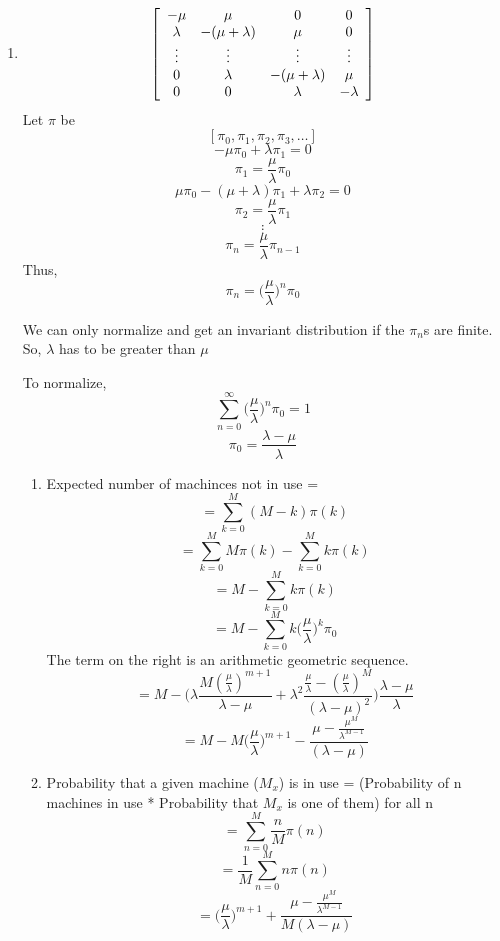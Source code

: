 \documentclass[a4paper,11pt]{article}
\newenvironment{mat}{\left[ \begin{array}{ccccccccccccc}}{\end{array}\right]}
\newcommand\bcm{\begin{mat}}
\newcommand\ecm{\end{mat}}
\begin{document}
\begin{enumerate}
\item
\[\bcm -\mu &\mu &0 &0  \\ \lambda &-(\mu+\lambda) &\mu  &0 \\ \vdots &\vdots   &\vdots &\vdots \\0 &\lambda &-(\mu+\lambda) &\mu    \\ 0 &0   &\lambda &-\lambda \ecm\]
Let $\pi$ be
\[ [\pi_0, \pi_1, \pi_2,\pi_3 ,\ldots]\]
\[-\mu \pi_0 + \lambda \pi_1 =0\]
\[\pi_1 = \frac{\mu}{\lambda}\pi_0\]
\[\mu \pi_{0} -(\mu +\lambda)\pi_1 + \lambda \pi_{2} =0\]
\[\pi_2 = \frac{\mu}{\lambda} \pi_1\]
\[\vdots\]
\[\pi_n = \frac{\mu}{\lambda} \pi_{n-1}\]
Thus, \[\pi_n =\bigg(\frac{\mu}{\lambda}\bigg)^n \pi_0 \]


We can only normalize and get an invariant distribution if the $\pi_n$s are finite. So, $\lambda$ has to be greater than $\mu$

To normalize,
\[\sum_{n=0}^{\infty} \bigg(\frac{\mu}{\lambda}\bigg)^n \pi_0= 1 \]
\[ \pi_0= \frac{\lambda-\mu}{\lambda}\]
\begin{enumerate}
\item
Expected number of machinces not in use = 
\[= \sum_{k=0}^M (M-k) \pi(k)\]
\[= \sum_{k=0}^M M \pi(k) -\sum_{k=0}^M k \pi(k) \] 
\[= M -\sum_{k=0}^M k \pi(k) \] 
\[= M -\sum_{k=0}^M k \bigg(\frac{\mu}{\lambda}\bigg)^k \pi_0\] 
The term on the right is an arithmetic geometric sequence.
\[= M - \bigg(\lambda\frac{M(\frac{\mu}{\lambda})^{m+1}}{\lambda-\mu}+ \lambda^2\frac{\frac{\mu}{\lambda}-(\frac{\mu}{\lambda})^M}{(\lambda-\mu)^2}\bigg)\frac{\lambda-\mu}{\lambda}\]
\[= M - M\bigg(\frac{\mu}{\lambda}\bigg)^{m+1}-\frac{\mu - \frac{\mu^M}{\lambda^{M-1}}}{(\lambda-\mu)}\]
\item 
Probability that a given machine ($M_x$) is in use = (Probability of n machines in use * Probability that $M_x$ is one of them) for all n
\[ = \sum_{n=0}^{M} \frac{n}{M}\pi(n)\]
\[ = \frac{1}{M} \sum_{n=0}^{M} n \pi(n)\]
\[= \bigg(\frac{\mu}{\lambda}\bigg)^{m+1}+\frac{\mu - \frac{\mu^M}{\lambda^{M-1}}}{M(\lambda-\mu)}\]




\end{enumerate} 
\end{enumerate}  
\end{document}
